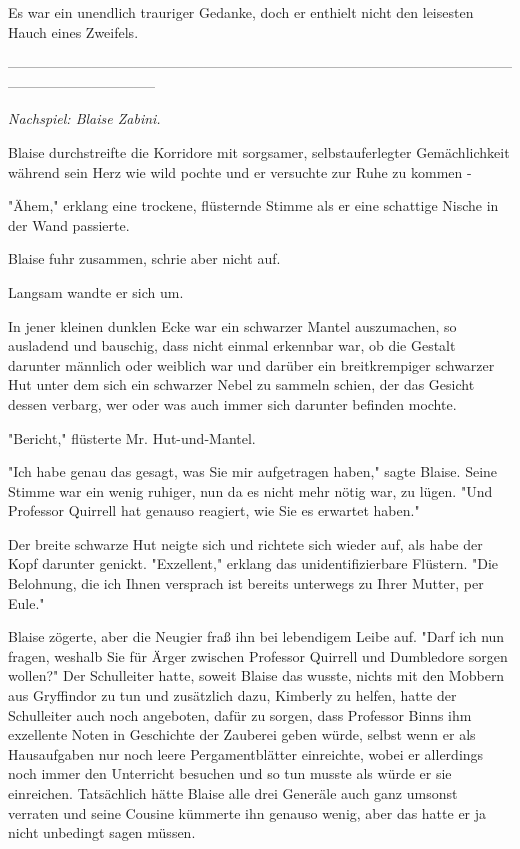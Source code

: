 {Es war ein unendlich trauriger Gedanke, doch er enthielt nicht den leisesten Hauch eines Zweifels.

--------------------------------------------------------------------------------------------------------------------------------------------

\emph{Nachspiel: Blaise Zabini.}

Blaise durchstreifte die Korridore mit sorgsamer, selbstauferlegter Gemächlichkeit während sein Herz wie wild pochte und er versuchte zur Ruhe zu kommen -

"Ähem," erklang eine trockene, flüsternde Stimme als er eine schattige Nische in der Wand passierte.

Blaise fuhr zusammen, schrie aber nicht auf.

Langsam wandte er sich um.

In jener kleinen dunklen Ecke war ein schwarzer Mantel auszumachen, so ausladend und bauschig, dass nicht einmal erkennbar war, ob die Gestalt darunter männlich oder weiblich war und darüber ein breitkrempiger schwarzer Hut unter dem sich ein schwarzer Nebel zu sammeln schien, der das Gesicht dessen verbarg, wer oder was auch immer sich darunter befinden mochte.

"Bericht," flüsterte Mr. Hut-und-Mantel.

"Ich habe genau das gesagt, was Sie mir aufgetragen haben," sagte Blaise. Seine Stimme war ein wenig ruhiger, nun da es nicht mehr nötig war, zu lügen. "Und Professor Quirrell hat genauso reagiert, wie Sie es erwartet haben."

Der breite schwarze Hut neigte sich und richtete sich wieder auf, als habe der Kopf darunter genickt. "Exzellent," erklang das unidentifizierbare Flüstern. "Die Belohnung, die ich Ihnen versprach ist bereits unterwegs zu Ihrer Mutter, per Eule."

Blaise zögerte, aber die Neugier fraß ihn bei lebendigem Leibe auf. "Darf ich nun fragen, weshalb Sie für Ärger zwischen Professor Quirrell und Dumbledore sorgen wollen?" Der Schulleiter hatte, soweit Blaise das wusste, nichts mit den Mobbern aus Gryffindor zu tun und zusätzlich dazu, Kimberly zu helfen, hatte der Schulleiter auch noch angeboten, dafür zu sorgen, dass Professor Binns ihm exzellente Noten in Geschichte der Zauberei geben würde, selbst wenn er als Hausaufgaben nur noch leere Pergamentblätter einreichte, wobei er allerdings noch immer den Unterricht besuchen und so tun musste als würde er sie einreichen. Tatsächlich hätte Blaise alle drei Generäle auch ganz umsonst verraten und seine Cousine kümmerte ihn genauso wenig, aber das hatte er ja nicht unbedingt sagen müssen.

}
